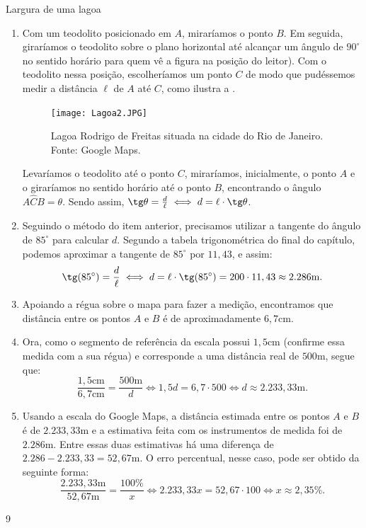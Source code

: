 \begin{answer}{Largura de uma lagoa}
{
\begin{enumerate}
 \item{}
Com um teodolito posicionado em $A$, miraríamos o ponto $B$. Em seguida, giraríamos o teodolito sobre o plano horizontal até alcançar um ângulo de $90^\circ$ no sentido horário para quem vê a figura na posição do leitor). Com o teodolito nessa posição, escolheríamos um ponto $C$ de modo que pudéssemos medir a distância $\ell$ de $A$ até $C$, como ilustra a  .
    \begin{figure}[H]
    \centering
    \texttt{[image: Lagoa2.JPG]}
    \caption{Lagoa Rodrigo de Freitas situada na cidade do Rio de Janeiro. Fonte: Google Maps.}
    \label{Lagoa2}
\end{figure}
Levaríamos o teodolito até o ponto $C$, miraríamos, inicialmente, o ponto $A$ e o giraríamos no sentido horário até o ponto $B$, encontrando o ângulo $A\hat{C}B=\theta$. Sendo assim, $\tg\theta=\frac{d}{\ell} \iff d=\ell\cdot\tg\theta$.

\item{} 
Seguindo o método do item anterior, precisamos utilizar a tangente do ângulo de $85^\circ$ para calcular $d$. Segundo a tabela trigonométrica do final do capítulo, podemos aproximar a tangente de $85^\circ$ por $11,43$, e assim:
$$\tg(85^\circ)=\frac{d}{\ell} \iff d=\ell\cdot\tg(85^\circ) = 200 \cdot 11,43 \approx 2.286\text{m}.$$

\item{} Apoiando a régua sobre o mapa para fazer a medição, encontramos que distância entre os pontos $A$ e $B$ é de aproximadamente $6,7$cm.
   
\item{} Ora, como o segmento de referência da escala possui $1,5$cm (confirme essa medida com a sua régua) e corresponde a uma distância real de $500$m, segue que:
$$\frac{1,5 \text{cm}}{6,7 \text{cm}}=\frac{500 \text{m}}{d} \iff 1,5d=6,7\cdot 500 \iff d \approx 2.233,33 \text{m}.$$

\item{} Usando a escala do Google Maps, a distância estimada entre os pontos $A$ e $B$ é de $2.233,33$m e a estimativa feita com os instrumentos de medida foi de $2.286$m. Entre essas duas estimativas há uma diferença de $2.286  - 2.233,33 =52,67$m. O erro percentual, nesse caso, pode ser obtido da seguinte forma:
$$\frac{2.233,33 \text{m}}{52,67 \text{m}}=\frac{100\%}{x} \iff 2.233,33x=52,67\cdot 100 \iff x\approx 2,35 \%.$$
\end{enumerate}
}{9}
\end{answer}

